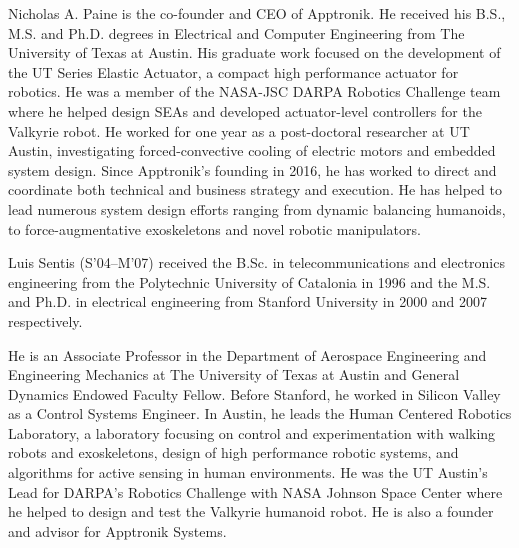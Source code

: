 \documentclass{ieeeaccess}
\begin{document}
\begin{IEEEbiography}
	{Nicholas A. Paine} is the co-founder and CEO of Apptronik. He received his B.S., M.S. and Ph.D. degrees in Electrical and Computer Engineering from The University of Texas at Austin.  His graduate work focused on the development of the UT Series Elastic Actuator, a compact high performance actuator for robotics.  He was a member of the NASA-JSC DARPA Robotics Challenge team where he helped design SEAs and developed actuator-level controllers for the Valkyrie robot.  He worked for one year as a post-doctoral researcher at UT Austin, investigating forced-convective cooling of electric motors and embedded system design.  Since Apptronik's founding in 2016, he has worked to direct and coordinate both technical and business strategy and execution.  He has helped to lead numerous system design efforts ranging from dynamic balancing humanoids, to force-augmentative exoskeletons and novel robotic manipulators.
\end{IEEEbiography}

\begin{IEEEbiography}
	{Luis Sentis} (S'04--M'07) received the B.Sc. in telecommunications and electronics engineering from the Polytechnic University of Catalonia in 1996 and the M.S. and Ph.D. in electrical engineering from Stanford University in 2000 and 2007 respectively. 
	
	He is an Associate Professor in the Department of Aerospace Engineering and Engineering Mechanics at The University of Texas at Austin and General Dynamics Endowed Faculty Fellow. Before Stanford, he worked in Silicon Valley as a Control Systems Engineer. In Austin, he leads the Human Centered Robotics Laboratory, a laboratory focusing on control and experimentation with walking robots and exoskeletons, design of high performance robotic systems, and algorithms for active sensing in human environments. He was the UT Austin's Lead for DARPA's Robotics Challenge with NASA Johnson Space Center where he helped to design and test the Valkyrie humanoid robot. He is also a founder and advisor for Apptronik Systems.
\end{IEEEbiography}

\EOD
\end{document}
